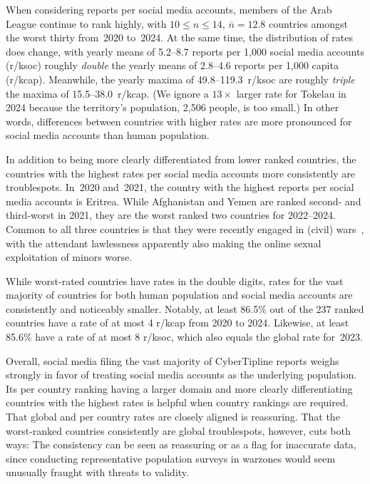 \documentclass[anonymous,nonacm,screen,12pt]{acmart}
\newcommand\hidden[1]{}
\theoremstyle{definition}
\begin{document}
When considering reports per social media accounts, members of the Arab League
continue to rank highly, with $10\leq{}n\leq{}14$, $\overline{n}=12.8$ countries
amongst the worst thirty from~2020 to~2024. At the same time, the distribution
of rates does change, with yearly means of 5.2--8.7 reports per 1,000 social
media accounts (r/ksoc) roughly \emph{double} the yearly means of 2.8--4.6
reports per 1,000 capita (r/kcap). Meanwhile, the yearly maxima of
49.8--119.3~r/ksoc are roughly \emph{triple} the maxima of 15.5--38.0~r/kcap.
(We ignore a $13\times$ larger rate for Tokelau in 2024 because the territory's
population, 2,506 people, is too small.) In other words, differences between
countries with higher rates are more pronounced for social media accounts than
human population.

\hidden{
Figure~\ref{fig:countries} illustrates the per-country ranking for reports per
social media accounts in 2023. First-ranked Yemen, with 79.1~r/ksoc, stands out
against the rest of the world due to its red-black shade. Thanks to their
saturated red shades, Afghanistan with 55.3~r/ksoc and Bangladesh with
47.8~r/ksoc also are clearly noticeable. All other countries have comparably
smaller rates, at most 37.6~r/ksoc, and hence are shaded orange or yellow.
}

In addition to being more clearly differentiated from lower ranked countries,
the countries with the highest rates per social media accounts more consistently
are troublespots. In~2020 and~2021, the country with the highest reports per
social media accounts is Eritrea. While Afghanistan and Yemen are ranked second-
and third-worst in 2021, they are the worst ranked two countries for 2022--2024.
Common to all three countries is that they were recently engaged in (civil)
wars~\cite{GlobalConflictTracker2025, GlobalConflictTracker2025a,
GlobalConflictTracker2025b}, with the attendant lawlessness apparently also
making the online sexual exploitation of minors worse.

While worst-rated countries have rates in the double digits, rates for the vast
majority of countries for both human population and social media accounts are
consistently and noticeably smaller. Notably, at least 86.5\% out of the 237
ranked countries have a rate of at most 4 r/kcap from 2020 to 2024. Likewise, at
least 85.6\% have a rate of at most 8 r/ksoc, which also equals the global rate
for~2023.

Overall, social media filing the vast majority of CyberTipline reports weighs
strongly in favor of treating social media accounts as the underlying
population. Its per country ranking having a larger domain and more clearly
differentiating countries with the highest rates is helpful when country
rankings are required. That global and per country rates are closely aligned is
reassuring. That the worst-ranked countries consistently are global
troublespots, however, cuts both ways: The consistency can be seen as reassuring
or as a flag for inaccurate data, since conducting representative population
surveys in warzones would seem unusually fraught with threats to validity.
\end{document}
